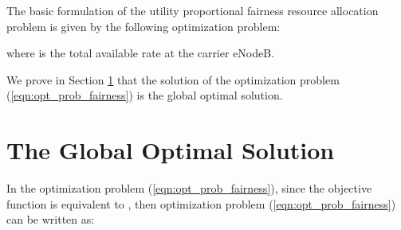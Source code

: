 \documentclass[journal]{IEEEtran} 		\usepackage{amsmath,amssymb}
\begin{document}
The basic formulation of the utility proportional fairness resource allocation problem is given by the following optimization problem:

where  is the total available rate at the  carrier eNodeB.

We prove in Section \ref{sec:Proof} that the solution of the optimization problem (\ref{eqn:opt_prob_fairness}) is the global optimal solution.
\section{The Global Optimal Solution}\label{sec:Proof}

In the optimization problem (\ref{eqn:opt_prob_fairness}), since the objective function  is equivalent to , then optimization problem (\ref{eqn:opt_prob_fairness}) can be written as:
\end{document}
